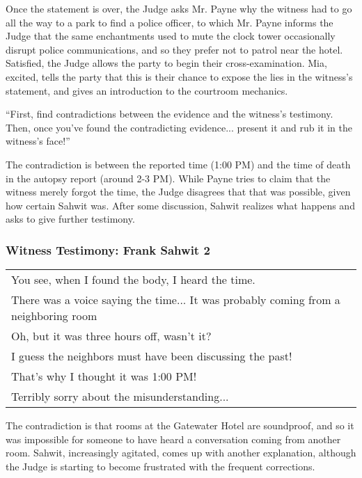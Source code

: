 Once the statement is over, the Judge asks Mr. Payne why the witness had to go all the way to a park to find a police officer, to which Mr. Payne informs the Judge that the same enchantments used to mute the clock tower occasionally disrupt police communications, and so they prefer not to patrol near the hotel. Satisfied, the Judge allows the party to begin their cross-examination. Mia, excited, tells the party that this is their chance to expose the lies in the witness's statement, and gives an introduction to the courtroom mechanics.

\begin{center}
``First, find contradictions between the evidence and the witness's testimony. Then, once you've found the contradicting evidence... present it and rub it in the witness's face!''
\end{center}

The contradiction is between the reported time (1:00 PM) and the time of death in the autopsy report (around 2-3 PM). While Payne tries to claim that the witness merely forgot the time, the Judge disagrees that that was possible, given how certain Sahwit was. After some discussion, Sahwit realizes what happens and asks to give further testimony.

\subsubsection{Witness Testimony: Frank Sahwit 2}
\begin{center}
\begin{tabular}{p{4in}}
You see, when I found the body, I heard the time. \\
There was a voice saying the time... It was probably coming from a neighboring room \\
Oh, but it was three hours off, wasn't it? \\
I guess the neighbors must have been discussing the past! \\
That's why I thought it was 1:00 PM! \\
Terribly sorry about the misunderstanding...
\end{tabular}
\end{center}

The contradiction is that rooms at the Gatewater Hotel are soundproof, and so it was impossible for someone to have heard a conversation coming from another room. Sahwit, increasingly agitated, comes up with another explanation, although the Judge is starting to become frustrated with the frequent corrections. \\

